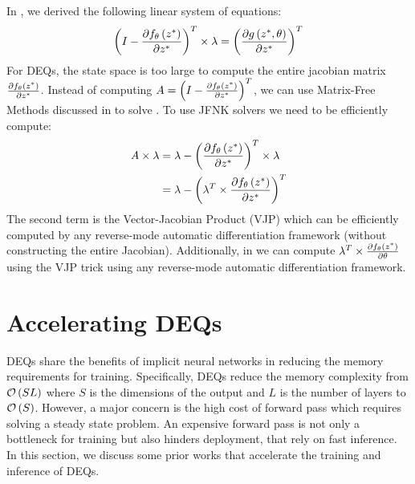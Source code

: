 In , we derived the following linear system of equations:
%
\begin{equation}
  \left( I - \frac{\partial f_\theta\left(z^*\right)}{\partial z^*} \right)^T \times \lambda = \left(\frac{\partial g\left(z^*, \theta\right)}{\partial z^*}\right)^T
\end{equation}
%
For DEQs, the state space is too large to compute the entire jacobian matrix $\frac{\partial f_\theta\left(z^*\right)}{\partial z^*}$. Instead of computing $ A = \left( I - \frac{\partial f_\theta\left(z^*\right)}{\partial z^*} \right)^T $, we can use Matrix-Free Methods discussed in  to solve . To use JFNK solvers we need to be efficiently compute:
%
\begin{align}
  A \times \lambda & = \lambda - \left( \frac{\partial f_\theta\left(z^*\right)}{\partial z^*} \right)^T  \times \lambda   \\
                   & = \lambda - \left( \lambda^T \times  \frac{\partial f_\theta\left(z^*\right)}{\partial z^*} \right)^T
\end{align}
%
The second term is the Vector-Jacobian Product (VJP) which can be efficiently computed by any reverse-mode automatic differentiation framework (without constructing the entire Jacobian). Additionally, in  we can compute $\lambda^T \times \frac{\partial f_\theta\left(z^*\right)}{\partial \theta}$ using the VJP trick using any reverse-mode automatic differentiation framework.




\section{Accelerating DEQs}
\label{sec:accelerating_deqs}

DEQs share the benefits of implicit neural networks in reducing the memory requirements for training. Specifically, DEQs reduce the memory complexity from $\mathcal{O}\left(SL\right)$ where $S$ is the dimensions of the output and $L$ is the number of layers to $\mathcal{O}\left(S\right)$. However, a major concern is the high cost of forward pass which requires solving a steady state problem. An expensive forward pass is not only a bottleneck for training but also hinders deployment, that rely on fast inference. In this section, we discuss some prior works that accelerate the training and inference of DEQs.

